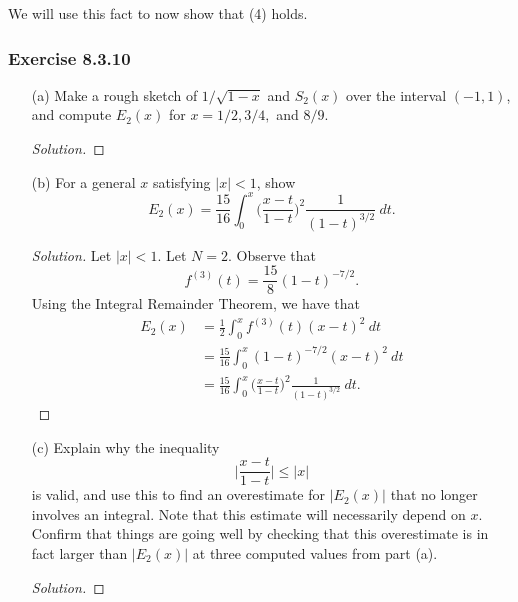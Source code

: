 We will use this fact to now show that (4) holds.

\subsubsection{Exercise 8.3.10} 
\begin{enumerate}
    \item[(a)] Make a rough sketch of \( 1 / \sqrt{ 1 -x  }  \) and \( S_{2}(x)  \) over the interval \( (-1,1)  \), and compute \( E_{2}(x)  \) for \( x = 1/2 , 3/4 ,  \) and \( 8/9  \).
        \begin{proof}[Solution]
        
        \end{proof}
    \item[(b)] For a general \( x  \) satisfying \(  |  x  |  < 1  \), show 
        \[  E_{2}(x) = \frac{ 15 }{ 16  }  \int_{ 0 }^{ x  }  \Big( \frac{ x - t  }{ 1 - t  }  \Big)^{2} \frac{ 1 }{ (1-t)^{3/2 } }  \ dt. \]
        \begin{proof}[Solution]
        Let \( |  x  |  < 1  \). Let \( N = 2  \). Observe that 
        \[  f^{(3)}(t) = \frac{ 15 }{ 8  }  (1- t )^{-7/2}.\] Using the Integral Remainder Theorem, we have that 
        \begin{align*}
            E_{2}(x) &= \frac{ 1 }{ 2 } \int_{ 0 }^{ x }  f^{(3)}(t) (x-t)^{2} \  dt   \\
                     &= \frac{ 15 }{ 16 } \int_{ 0 }^{ x }  (1-t)^{-7/2} (x - t )^{2} \  dt \\
                     &= \frac{ 15 }{ 16 }  \int_{ 0 }^{ x  }  \Big( \frac{ x - t  }{ 1 - t  }  \Big)^{2} \frac{ 1 }{ (1-t)^{3/2 } }  \  dt.
        \end{align*}
        \end{proof}
    \item[(c)] Explain why the inequality 
        \[  \Big| \frac{ x - t  }{ 1 -t  }  \Big|  \leq | x  |  \]
        is valid, and use this to find an overestimate for \( | E_{2}(x)  |   \) that no longer involves an integral. Note that this estimate will necessarily depend on \( x  \). Confirm that things are going well by checking that this overestimate is in fact larger than \( | E_{2}(x)  |  \) at three computed values from part (a).
        \begin{proof}[Solution]
        

\end{proof}
\end{enumerate}
